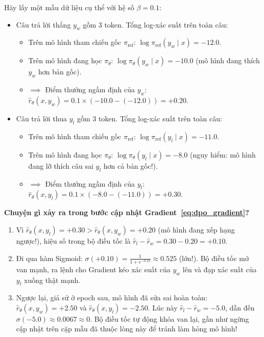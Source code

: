 \begin{mathdecode}
Hãy lấy một mẫu dữ liệu cụ thể với hệ số $\beta = 0.1$:
\begin{itemize}
  \item Câu trả lời thắng $y_w$ gồm 3 token. Tổng log-xác suất trên toàn câu:
  \begin{itemize}
    \item Trên mô hình tham chiếu gốc $\pi_{\text{ref}}$: $\log \pi_{\text{ref}}(y_w \mid x) = -12.0$.
    \item Trên mô hình đang học $\pi_\theta$: $\log \pi_\theta(y_w \mid x) = -10.0$ (mô hình đang thích $y_w$ hơn bản gốc).
    \item $\implies$ Điểm thưởng ngầm định của $y_w$: $\hat{r}_\theta(x, y_w) = 0.1 \times (-10.0 - (-12.0)) = \mathbf{+0.20}$.
  \end{itemize}
  \item Câu trả lời thua $y_l$ gồm 3 token. Tổng log-xác suất trên toàn câu:
  \begin{itemize}
    \item Trên mô hình tham chiếu gốc $\pi_{\text{ref}}$: $\log \pi_{\text{ref}}(y_l \mid x) = -11.0$.
    \item Trên mô hình đang học $\pi_\theta$: $\log \pi_\theta(y_l \mid x) = -8.0$ (nguy hiểm: mô hình đang lỡ thích câu sai $y_l$ hơn cả bản gốc!).
    \item $\implies$ Điểm thưởng ngầm định của $y_l$: $\hat{r}_\theta(x, y_l) = 0.1 \times (-8.0 - (-11.0)) = \mathbf{+0.30}$.
  \end{itemize}
\end{itemize}

\textbf{Chuyện gì xảy ra trong bước cập nhật Gradient~\eqref{eq:dpo_gradient}?}
\begin{enumerate}
  \item Vì $\hat{r}_\theta(x, y_l) = +0.30 > \hat{r}_\theta(x, y_w) = +0.20$ (mô hình đang xếp hạng ngược!), hiệu số trong bộ điều tốc là $\hat{r}_l - \hat{r}_w = 0.30 - 0.20 = +0.10$.
  \item Đi qua hàm Sigmoid: $\sigma(+0.10) = \frac{1}{1 + e^{-0.10}} \approx \mathbf{0.525}$ (lớn!). Bộ điều tốc mở van mạnh, ra lệnh cho Gradient kéo xác suất của $y_w$ lên và đạp xác suất của $y_l$ xuống thật mạnh.
  \item Ngược lại, giả sử ở epoch sau, mô hình đã sửa sai hoàn toàn: $\hat{r}_\theta(x, y_w) = +2.50$ và $\hat{r}_\theta(x, y_l) = -2.50$. Lúc này $\hat{r}_l - \hat{r}_w = -5.0$, dẫn đến $\sigma(-5.0) \approx \mathbf{0.0067} \approx 0$. Bộ điều tốc tự động khóa van lại, gần như ngừng cập nhật trên cặp mẫu đã thuộc lòng này để tránh làm hỏng mô hình!
\end{enumerate}
\end{mathdecode}

